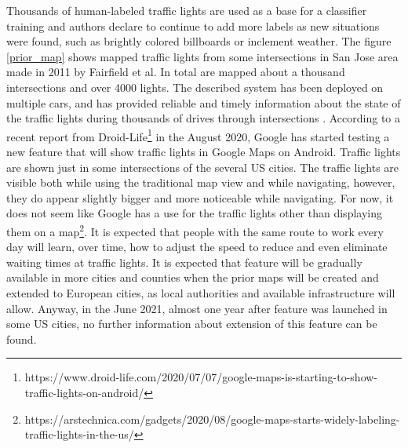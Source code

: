 \documentclass[letterpaper, 10 pt, conference]{ieeeconf} %
\begin{document}
Thousands of human-labeled traffic lights are used as a base for a classifier training and authors declare to continue to add more labels as new situations were found, such as brightly colored billboards or inclement weather. The figure \ref{prior_map} shows mapped traffic lights from some intersections in San Jose area made in 2011 by Fairfield et al. In total are mapped about a thousand intersections and over 4000 lights. The described system has been deployed on multiple cars, and has provided reliable and timely information about the state of the traffic lights during thousands of drives through intersections \cite{c5}. According to a recent report from Droid-Life\footnote{https://www.droid-life.com/2020/07/07/google-maps-is-starting-to-show-traffic-lights-on-android/} in the August 2020, Google has started testing a new feature that will show traffic lights in Google Maps on Android. Traffic lights are shown just in some intersections of the several US cities. The traffic lights are visible both while using the traditional map view and while navigating, however, they do appear slightly bigger and more noticeable while navigating. For now, it does not seem like Google has a use for the traffic lights other than displaying them on a map\footnote{https://arstechnica.com/gadgets/2020/08/google-maps-starts-widely-labeling-traffic-lights-in-the-us/}. It is expected that people with the same route to work every day will learn, over time, how to adjust the speed to reduce and even eliminate waiting times at traffic lights. It is expected that feature will be gradually available in more cities and counties when the prior maps will be created and extended to European cities, as local authorities and available infrastructure will allow. Anyway, in the June 2021, almost one year after feature was launched in some US cities, no further information about extension of this feature can be found. 
 
 
\end{document}
